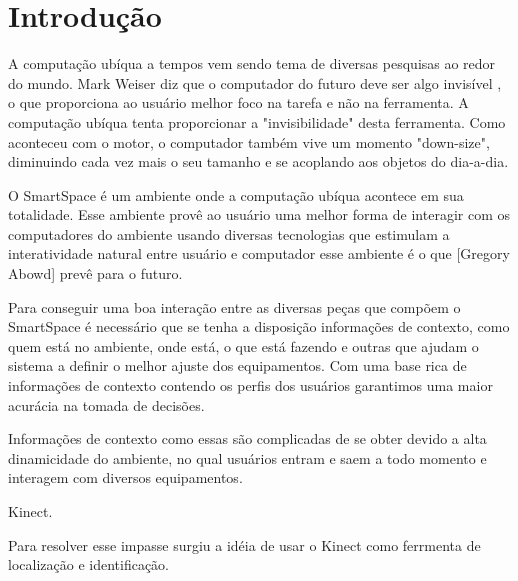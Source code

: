 \textual

\chapter{Introdução}
	
A computação ubíqua a tempos vem sendo tema de diversas pesquisas ao redor do mundo. Mark Weiser diz que o computador do futuro deve ser algo invisível \cite{weiser1} \cite{weiser2}, o que proporciona ao usuário melhor foco na tarefa e não na ferramenta. A computação ubíqua tenta proporcionar a "invisibilidade" desta ferramenta. Como aconteceu com o motor, o computador também vive um momento "down-size", diminuindo cada vez mais o seu tamanho e se acoplando aos objetos do dia-a-dia.

O SmartSpace é um ambiente onde a computação ubíqua acontece em sua totalidade. Esse ambiente provê ao usuário uma melhor forma de interagir com os computadores do ambiente usando diversas tecnologias que estimulam a interatividade natural entre usuário e computador esse ambiente é o que [Gregory Abowd] prevê para o futuro.

Para conseguir uma boa interação entre as diversas peças que compõem o SmartSpace é necessário que se tenha a disposição informações de contexto,  como quem está no ambiente, onde está, o que está fazendo e outras que ajudam o sistema a definir o melhor ajuste dos equipamentos. Com uma base rica de informações de contexto contendo os perfis dos usuários garantimos uma maior acurácia na tomada de decisões. 

Informações de contexto como essas são complicadas de se obter devido a alta dinamicidade do ambiente, no qual usuários entram e saem a todo momento e interagem com diversos equipamentos.

Kinect.

Para resolver esse impasse surgiu a idéia de usar o Kinect como ferrmenta de localização e identificação.
